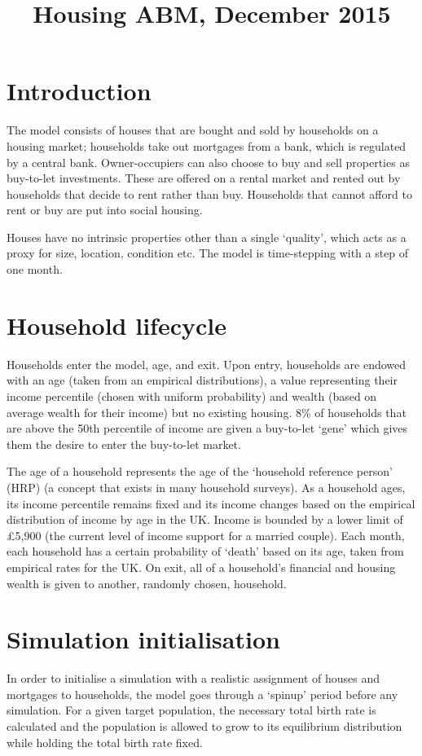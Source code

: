 \documentclass{article}
\begin{document}
\title{Housing ABM, December 2015}
\maketitle

\section{Introduction}
The model consists of houses that are bought and sold by households on a housing market; households take out mortgages from a bank, which is regulated by a central bank. Owner-occupiers can also choose to buy and sell properties as buy-to-let investments. These are offered on a rental market and rented out by households that decide to rent rather than buy. Households that cannot afford to rent or buy are put into social housing.

Houses have no intrinsic properties other than a single `quality', which acts as a proxy for size, location, condition etc. The model is time-stepping with a step of one month.

\section{Household lifecycle}

Households enter the model, age, and exit. Upon entry, households are endowed with an age (taken from an empirical distributions), a value representing their income percentile (chosen with uniform probability) and wealth (based on average wealth for their income) but no existing housing. 8\% of households that are above the 50th percentile of income are given a buy-to-let `gene' which gives them the desire to enter the buy-to-let market.

The age of a household represents the age of the `household reference person' (HRP) (a concept that exists in many household surveys). As a household ages, its income percentile remains fixed and its income changes based on the empirical distribution of income by age in the UK. Income is bounded by a lower limit of \pounds 5,900 (the current level of income support for a married couple).
Each month, each household has a certain probability of `death' based on its age, taken from empirical rates for the UK. On exit, all of a household's financial and housing wealth is given to another, randomly chosen, household.
 
\section{Simulation initialisation}
In order to initialise a simulation with a realistic assignment of houses and mortgages to households, the model goes through a `spinup' period before any simulation. For a given target population, the necessary total birth rate is calculated and the population is allowed to grow to its equilibrium distribution while holding the total birth rate fixed.
\end{document}
